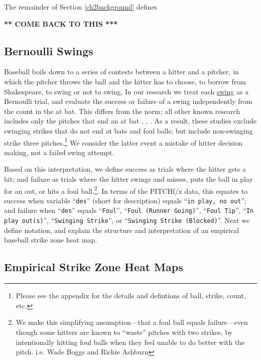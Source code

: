 The remainder of Section \ref{ch2background} defines 

{\bf *** COME BACK TO THIS *** }

\subsection{Bernoulli Swings}

Baseball boils down to a series of contests between a hitter and a pitcher, in which the pitcher throws the ball and the hitter has to choose, to borrow from Shakespeare, to swing or not to swing. In our research we treat each \underline{swing} as a Bernoulli trial, and evaluate the success or failure of a swing independently from the count in the at bat. This differs from the norm; all other known research includes only the pitches that end an at bat \citep{Cross2015}, \citep{Baumer2010}, \citep{Fast2011}. As a result, these studies exclude swinging strikes that do not end at bats and foul balls; but include non-swinging strike three pitches.\footnote{Please see the appendix for the details and defintions of ball, strike, count, etc.} We consider the latter event a mistake of hitter decision making, not a failed swing attempt. 

Based on this interpretation, we define success as trials where the hitter gets a hit; and failure as trials where the hitter swings and misses, puts the ball in play for an out, or hits a foul ball.\footnote{We make this simplifying assumption---that a foul ball equals failure---even though some hitters are known to ``waste'' pitches with two strikes, by intentionally hitting foul balls when they feel unable to do better with the pitch. i.e. Wade Boggs and Richie Ashburn}. In terms of the PITCHf/x\textsuperscript{\textregistered} data, this equates to success when variable ``\verb|des|'' (short for description)  equals ``\verb|in play, no out|''; and failure when ``\verb|des|'' equals ``\verb|Foul|'', ``\verb|Foul (Runner Going)|'', ``\verb|Foul Tip|'', ``\verb|In play out(s)|'', ``\verb|Swinging Strike|'', or ``\verb|Swinging Strike (Blocked)|''. Next we define notation, and explain the structure and interpretation of an empirical baseball strike zone heat map.

\subsection{Empirical Strike Zone Heat Maps}

